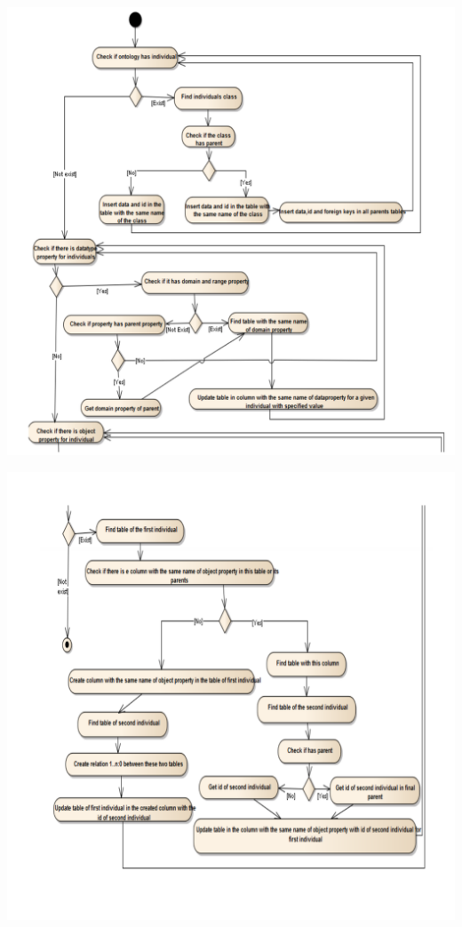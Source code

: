 \documentclass{fancyslides}
\begin{document}
\begin{frame}
\misc
{
\begin{center}
\includegraphics[scale=0.12]{inserting_data1}
\end{center}
}
\end{frame}

\begin{frame}
\misc
{
\begin{center}
\includegraphics[scale=0.12]{inserting_data2}
\end{center}
}
\end{frame}
\end{document}
